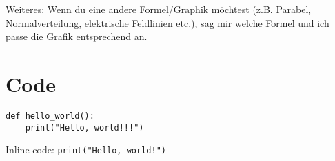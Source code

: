 \documentclass[a4paper,12pt]{article}
\begin{document}
\vspace{6mm}

Weiteres: Wenn du eine andere Formel/Graphik möchtest (z.B. Parabel, Normalverteilung, elektrische Feldlinien etc.), sag mir welche Formel und ich passe die Grafik entsprechend an.


\section{Code}
\begin{verbatim}
def hello_world():
    print("Hello, world!!!")
\end{verbatim}


Inline code: \texttt{print("Hello, world!")}
\end{document}
